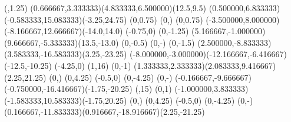 {    \closepath
    \moveto(,1.25)
    \rcurveto(0.666667,3.333333)(4.833333,6.500000)(12.5,9.5)
    \rcurveto(0.500000,6.833333)(-0.583333,15.083333)(-3.25,24.75)
    \rlineto(0,0.75)
    \rlineto(0,) %
    \rlineto(0,0.75)
    \rcurveto(-3.500000,8.000000)(-8.166667,12.666667)(-14.0,14.0)
    \rlineto(-0.75,0)
    \rlineto(0,-1.25)
    \rcurveto(5.166667,-1.000000)(9.666667,-5.333333)(13.5,-13.0)
    \rlineto(0,-0.5)
    \rlineto(0,-) %
    \rlineto(0,-1.5)
    \rcurveto(2.500000,-8.833333)(3.583333,-16.583333)(3.25,-23.25)
    \rcurveto(-8.000000,-3.000000)(-12.166667,-6.416667)(-12.5,-10.25)
    \rlineto(-4.25,0)
    \closepath
    \moveto(1,16)
    \rlineto(0,-1)
    \rcurveto(1.333333,2.333333)(2.083333,9.416667)(2.25,21.25)
    \rlineto(0,) %
    \rlineto(0,4.25)
    \rlineto(-0.5,0)
    \rlineto(0,-4.25)
    \rlineto(0,-) %
    \rcurveto(-0.166667,-9.666667)(-0.750000,-16.416667)(-1.75,-20.25)
    \closepath
    \moveto(,15)
    \rlineto(0,1)
    \rcurveto(-1.000000,3.833333)(-1.583333,10.583333)(-1.75,20.25)
    \rlineto(0,) %
    \rlineto(0,4.25)
    \rlineto(-0.5,0)
    \rlineto(0,-4.25)
    \rlineto(0,-) %
    \rcurveto(0.166667,-11.833333)(0.916667,-18.916667)(2.25,-21.25)
    \closepath
}

